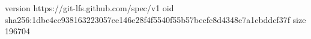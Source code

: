 version https://git-lfs.github.com/spec/v1
oid sha256:1dbe4cc938163223057ee146e28f4f5540f55b57becfc8d4348e7a1cbddcf37f
size 196704
